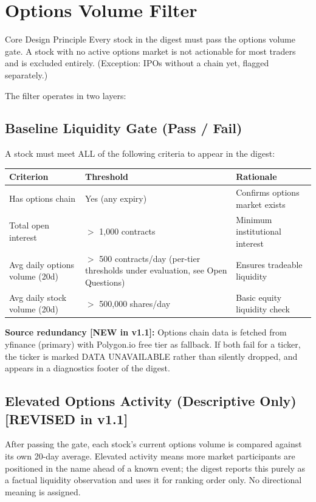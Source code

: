 \documentclass[11pt]{article}
\begin{document}
\section{Options Volume Filter}\label{sec:optionsfilter}

\begin{callout}{Core Design Principle}
Every stock in the digest must pass the options volume gate. A stock with no active options market is not actionable for most traders and is excluded entirely. (Exception: IPOs without a chain yet, flagged separately.)
\end{callout}

The filter operates in two layers:

\subsection{Baseline Liquidity Gate (Pass / Fail)}
A stock must meet ALL of the following criteria to appear in the digest:

\begin{tabularx}{\textwidth}{|L{4.6cm}|L{3.8cm}|X|}
\hline
\textbf{Criterion} & \textbf{Threshold} & \textbf{Rationale} \\
\hline
Has options chain & Yes (any expiry) & Confirms options market exists \\
\hline
Total open interest & $>$ 1{,}000 contracts & Minimum institutional interest \\
\hline
Avg daily options volume (20d) & $>$ 500 contracts/day (per-tier thresholds under evaluation, see Open Questions) & Ensures tradeable liquidity \\
\hline
Avg daily stock volume (20d) & $>$ 500{,}000 shares/day & Basic equity liquidity check \\
\hline
\end{tabularx}

\textbf{Source redundancy [NEW in v1.1]:} Options chain data is fetched from yfinance (primary) with Polygon.io free tier as fallback. If both fail for a ticker, the ticker is marked DATA UNAVAILABLE rather than silently dropped, and appears in a diagnostics footer of the digest.

\subsection{Elevated Options Activity (Descriptive Only) \hfill {\small [REVISED in v1.1]}}
After passing the gate, each stock's current options volume is compared against its own 20-day average. Elevated activity means more market participants are positioned in the name ahead of a known event; the digest reports this purely as a factual liquidity observation and uses it for ranking order only. No directional meaning is assigned.
\end{document}
